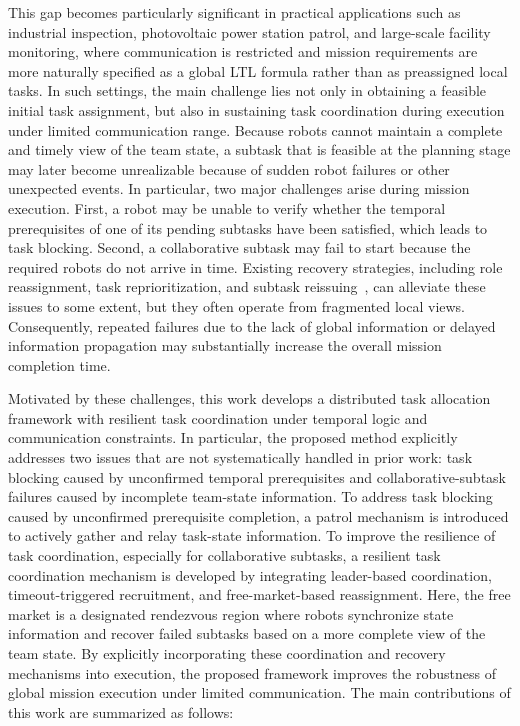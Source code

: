 \documentclass[lettersize,journal]{IEEEtran}
\begin{document}
This gap becomes particularly significant in practical applications such as industrial inspection, photovoltaic power station patrol, and large-scale facility monitoring, where communication is restricted and mission requirements are more naturally specified as a global LTL formula rather than as preassigned local tasks. In such settings, the main challenge lies not only in obtaining a feasible initial task assignment, but also in sustaining task coordination during execution under limited communication range. Because robots cannot maintain a complete and timely view of the team state, a subtask that is feasible at the planning stage may later become unrealizable because of sudden robot failures or other unexpected events. In particular, two major challenges arise during mission execution. First, a robot may be unable to verify whether the temporal prerequisites of one of its pending subtasks have been satisfied, which leads to task blocking. Second, a collaborative subtask may fail to start because the required robots do not arrive in time.
Existing recovery strategies, including role reassignment, task reprioritization, and subtask reissuing~\cite{fua2005cobos,choudhury2022dynamic,kalempa2021multi}, can alleviate these issues to some extent, but they often operate from fragmented local views. Consequently, repeated failures due to the lack of global information or delayed information propagation may substantially increase the overall mission completion time.

Motivated by these challenges, this work develops a distributed task allocation framework with resilient task coordination under temporal logic and communication constraints. In particular, the proposed method explicitly addresses two issues that are not systematically handled in prior work: task blocking caused by unconfirmed temporal prerequisites and collaborative-subtask failures caused by incomplete team-state information.
To address task blocking caused by unconfirmed prerequisite completion, a patrol mechanism is introduced to actively gather and relay task-state information. To improve the resilience of task coordination, especially for collaborative subtasks, a resilient task coordination mechanism is developed by integrating leader-based coordination, timeout-triggered recruitment, and free-market-based reassignment. Here, the free market is a designated rendezvous region where robots synchronize state information and recover failed subtasks based on a more complete view of the team state. By explicitly incorporating these coordination and recovery mechanisms into execution, the proposed framework improves the robustness of global mission execution under limited communication. The main contributions of this work are summarized as follows:
\end{document}
